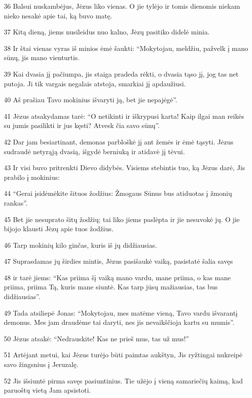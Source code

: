 \par 36 Balsui nuskambėjus, Jėzus liko vienas. O jie tylėjo ir tomis dienomis niekam nieko nesakė apie tai, ką buvo matę. 
\par 37 Kitą dieną, jiems nusileidus nuo kalno, Jėzų pasitiko didelė minia. 
\par 38 Ir štai vienas vyras iš minios ėmė šaukti: “Mokytojau, meldžiu, pažvelk į mano sūnų, jis mano vienturtis. 
\par 39 Kai dvasia jį pačiumpa, jis staiga pradeda rėkti, o dvasia tąso jį, jog tas net putoja. Ji tik vargais negalais atstoja, smarkiai jį apdaužiusi. 
\par 40 Aš prašiau Tavo mokinius išvaryti ją, bet jie nepajėgė”. 
\par 41 Jėzus atsakydamas tarė: “O netikinti ir iškrypusi karta! Kaip ilgai man reikės su jumis pasilikti ir jus kęsti? Atvesk čia savo sūnų”. 
\par 42 Dar jam besiartinant, demonas parbloškė jį ant žemės ir ėmė tąsyti. Jėzus sudraudė netyrąją dvasią, išgydė berniuką ir atidavė jį tėvui. 
\par 43 Ir visi buvo pritrenkti Dievo didybės. Visiems stebintis tuo, ką Jėzus darė, Jis prabilo į mokinius: 
\par 44 “Gerai įsidėmėkite šituos žodžius: Žmogaus Sūnus bus atiduotas į žmonių rankas”. 
\par 45 Bet jie nesuprato šitų žodžių; tai liko jiems paslėpta ir jie nesuvokė jų. O jie bijojo klausti Jėzų apie tuos žodžius. 
\par 46 Tarp mokinių kilo ginčas, kuris iš jų didžiausias. 
\par 47 Suprasdamas jų širdies mintis, Jėzus pasišaukė vaiką, pasistatė šalia savęs 
\par 48 ir tarė jiems: “Kas priima šį vaiką mano vardu, mane priima, o kas mane priima, priima Tą, kuris mane siuntė. Kas tarp jūsų mažiausias, tas bus didžiausias”. 
\par 49 Tada atsiliepė Jonas: “Mokytojau, mes matėme vieną, Tavo vardu išvarantį demonus. Mes jam draudėme tai daryti, nes jis nevaikščioja kartu su mumis”. 
\par 50 Jėzus atsakė: “Nedrauskite! Kas ne prieš mus, tas už mus!” 
\par 51 Artėjant metui, kai Jėzus turėjo būti paimtas aukštyn, Jis ryžtingai nukreipė savo žingsnius į Jeruzalę. 
\par 52 Jis išsiuntė pirma savęs pasiuntinius. Tie užėjo į vieną samariečių kaimą, kad paruoštų vietą Jam apsistoti. 
